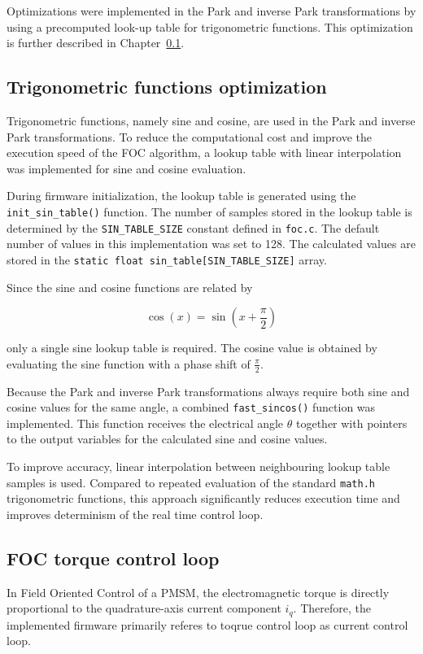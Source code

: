 Optimizations were implemented in the Park and inverse Park transformations by using a precomputed look-up table for trigonometric functions.
This optimization is further described in Chapter~\ref{trigonometric_optimitaion}.


\subsection{Trigonometric functions optimization}
\label{trigonometric_optimitaion}
Trigonometric functions, namely sine and cosine, are used in the Park and inverse Park transformations.
To reduce the computational cost and improve the execution speed of the FOC algorithm,
a lookup table with linear interpolation was implemented for sine and cosine evaluation.~\cite{TrigonometricFuncitonOptimization}

During firmware initialization, the lookup table is generated using the \texttt{init\_sin\_table()} function.
The number of samples stored in the lookup table is determined by the \texttt{SIN\_TABLE\_SIZE} constant defined in \texttt{foc.c}.
The default number of values in this implementation was set to 128.
The calculated values are stored in the \texttt{static float sin\_table[SIN\_TABLE\_SIZE]} array.

Since the sine and cosine functions are related by

\begin{equation}
    \cos(x) = \sin\left(x + \frac{\pi}{2}\right)
\end{equation}

only a single sine lookup table is required.
The cosine value is obtained by evaluating the sine function with a phase shift of $\frac{\pi}{2}$.

Because the Park and inverse Park transformations always require both sine and cosine values for the same angle,
a combined \texttt{fast\_sincos()} function was implemented.
This function receives the electrical angle $\theta$ together with pointers to the output variables for the calculated sine and cosine values.

To improve accuracy, linear interpolation between neighbouring lookup table samples is used.
Compared to repeated evaluation of the standard \texttt{math.h} trigonometric functions,
this approach significantly reduces execution time and improves determinism of the real time control loop.

\subsection{FOC torque control loop}
In Field Oriented Control of a PMSM, the electromagnetic torque is directly proportional to the quadrature-axis current component $i_q$. \cite{prayogo_foc}
Therefore, the implemented firmware primarily referes to toqrue control loop as current control loop.

